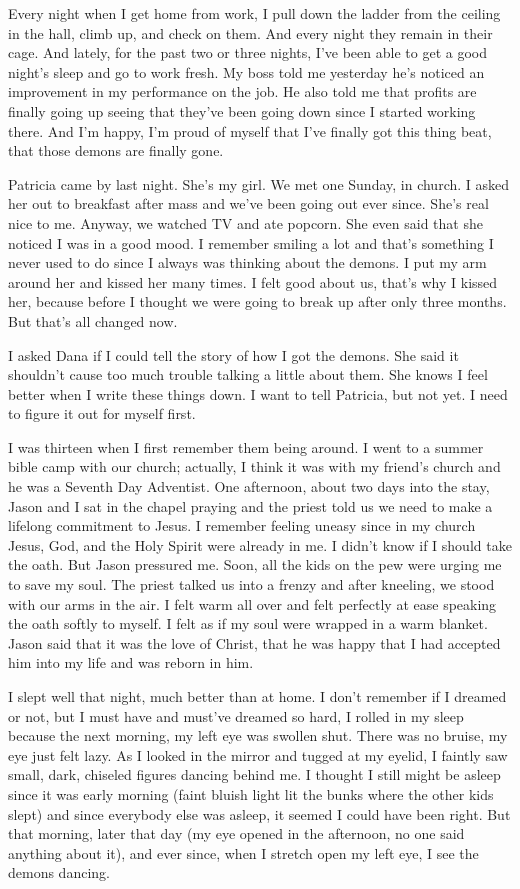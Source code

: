 \documentclass[
]{article}
\begin{document}
Every night when I get home from work, I pull down the ladder from the
ceiling in the hall, climb up, and check on them. And every night they
remain in their cage. And lately, for the past two or three nights, I've
been able to get a good night's sleep and go to work fresh. My boss told
me yesterday he's noticed an improvement in my performance on the job.
He also told me that profits are finally going up seeing that they've
been going down since I started working there. And I'm happy, I'm proud
of myself that I've finally got this thing beat, that those demons are
finally gone.

Patricia came by last night. She's my girl. We met one Sunday, in
church. I asked her out to breakfast after mass and we've been going out
ever since. She's real nice to me. Anyway, we watched TV and ate
popcorn. She even said that she noticed I was in a good mood. I remember
smiling a lot and that's something I never used to do since I always was
thinking about the demons. I put my arm around her and kissed her many
times. I felt good about us, that's why I kissed her, because before I
thought we were going to break up after only three months. But that's
all changed now.

I asked Dana if I could tell the story of how I got the demons. She said
it shouldn't cause too much trouble talking a little about them. She
knows I feel better when I write these things down. I want to tell
Patricia, but not yet. I need to figure it out for myself first.

I was thirteen when I first remember them being around. I went to a
summer bible camp with our church; actually, I think it was with my
friend's church and he was a Seventh Day Adventist. One afternoon, about
two days into the stay, Jason and I sat in the chapel praying and the
priest told us we need to make a lifelong commitment to Jesus. I
remember feeling uneasy since in my church Jesus, God, and the Holy
Spirit were already in me. I didn't know if I should take the oath. But
Jason pressured me. Soon, all the kids on the pew were urging me to save
my soul. The priest talked us into a frenzy and after kneeling, we stood
with our arms in the air. I felt warm all over and felt perfectly at
ease speaking the oath softly to myself. I felt as if my soul were
wrapped in a warm blanket. Jason said that it was the love of Christ,
that he was happy that I had accepted him into my life and was reborn in
him.

I slept well that night, much better than at home. I don't remember if I
dreamed or not, but I must have and must've dreamed so hard, I rolled in
my sleep because the next morning, my left eye was swollen shut. There
was no bruise, my eye just felt lazy. As I looked in the mirror and
tugged at my eyelid, I faintly saw small, dark, chiseled figures dancing
behind me. I thought I still might be asleep since it was early morning
(faint bluish light lit the bunks where the other kids slept) and since
everybody else was asleep, it seemed I could have been right. But that
morning, later that day (my eye opened in the afternoon, no one said
anything about it), and ever since, when I stretch open my left eye, I
see the demons dancing.
\end{document}
